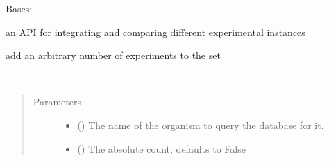 \documentclass[letterpaper,10pt,english]{sphinxmanual}
\begin{document}
\begin{fulllineitems}
\label{\detokenize{IPTK.Classes:IPTK.Classes.ExperimentalSet.ExperimentSet}}
Bases: 

an API for integrating and comparing different experimental instances

\begin{fulllineitems}
\label{\detokenize{IPTK.Classes:IPTK.Classes.ExperimentalSet.ExperimentSet.add_experiment}}
add an arbitrary number of experiments to the set

\end{fulllineitems}


\begin{fulllineitems}
\label{\detokenize{IPTK.Classes:IPTK.Classes.ExperimentalSet.ExperimentSet.compare_org_count_among_exps}}~\begin{quote}\begin{description}
\item[{Parameters}] \leavevmode\begin{itemize}
\item {} 
 () \textendash{} The name of the organism to query the database for it.

\item {} 
 (\sphinxstyleliteralemphasis{\sphinxupquote{, }}) \textendash{} The absolute count, defaults to False


\end{itemize}
\end{description}
\end{quote}
\end{fulllineitems}
\end{fulllineitems}
\end{document}
